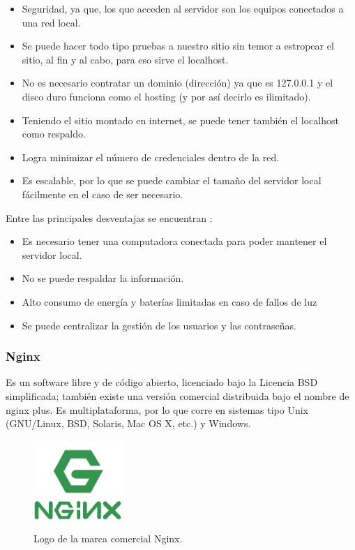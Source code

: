 \begin{itemize}
\item Seguridad, ya que, los que acceden al servidor son los equipos conectados a una red local. 
\item Se puede hacer todo tipo pruebas a nuestro sitio sin temor a estropear el sitio, al fin y al cabo, para eso sirve el localhost.
\item No es necesario contratar un dominio (dirección) ya que es 127.0.0.1 y el disco duro funciona como el hosting (y por así decirlo es ilimitado).
\item Teniendo el sitio montado en internet, se puede tener también el localhost como respaldo.
\item Logra minimizar el número de credenciales dentro de la red.
\item Es escalable, por lo que se puede cambiar el tamaño del servidor local fácilmente en el caso de ser necesario.
\end{itemize}

Entre las principales desventajas se encuentran \cite{Sanchez2018}:
\begin{itemize}
\item Es necesario tener una computadora conectada para poder mantener el servidor local.
\item No se puede respaldar la información.
\item Alto consumo de energía y baterías limitadas en caso de fallos de luz
\item Se puede centralizar la gestión de los usuarios y las contraseñas.
\end{itemize}

\subsubsection{Nginx}

Es un software libre y de código abierto, licenciado bajo la Licencia BSD simplificada; también existe una versión comercial distribuida bajo el nombre de nginx plus. Es multiplataforma, por lo que corre en sistemas tipo Unix (GNU/Linux, BSD, Solaris, Mac OS X, etc.) y Windows.

\begin{figure}[H]
\centering
\includegraphics[width=0.3\textwidth]{./imagenes/teoria/nginz.png} 
\caption{Logo de la marca comercial Nginx.}
\label{F:NGINX}
\end{figure}

